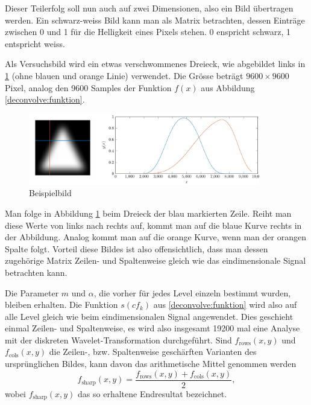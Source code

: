 Dieser Teilerfolg soll nun auch auf zwei Dimensionen, also ein Bild übertragen werden.
Ein schwarz-weiss Bild kann man als Matrix betrachten, dessen Einträge zwischen 0 und 1 für die Helligkeit eines Pixels stehen.
0 enspricht schwarz, 1 entspricht weiss.

Als Versuchsbild wird ein etwas verschwommenes Dreieck, wie abgebildet links in \ref{deconvolve:example} (ohne blauen und orange Linie) verwendet.
Die Grösse beträgt $9600\times9600$ Pixel, analog den 9600 Samples der Funktion $f(x)$ aus Abbildung \ref{deconvolve:funktion}.
\begin{figure}[h]
\centering
\includegraphics[width=0.9\textwidth]{./papers/deconvolve/pictures/dreieck.pdf}
\caption{Beispielbild\label{deconvolve:example}}
\end{figure}

Man folge in Abbildung \ref{deconvolve:example} beim Dreieck der blau markierten \glqq Zeile\grqq{}.
Reiht man diese Werte von links nach rechts auf, kommt man auf die blaue Kurve rechts in der Abbildung.
Analog kommt man auf die orange Kurve, wenn man der orangen \glqq Spalte\grqq{} folgt.
Vorteil diese Bildes ist also offensichtlich, dass man dessen zugehörige Matrix Zeilen- und Spaltenweise gleich wie das eindimensionale Signal betrachten kann.

Die Parameter $m$ und $\alpha$, die vorher für jedes Level einzeln bestimmt wurden, bleiben erhalten.
Die Funktion $s(cf_k)$ aus \eqref{deconvolve:funktion} wird also auf alle Level gleich wie beim eindimensionalen Signal angewendet.
Dies geschieht einmal Zeilen- und Spaltenweise, es wird also insgesamt 19200 mal eine Analyse mit der diskreten Wavelet-Transformation durchgeführt.
Sind $f_\text{rows}(x,y)$ und $f_\text{cols}(x,y)$ die Zeilen-, bzw. Spaltenweise \glqq geschärften\grqq{} Varianten des ursprünglichen Bildes, kann davon das arithmetische Mittel genommen werden
$$f_\text{sharp}(x,y)=\frac{f_\text{rows}(x,y)+f_\text{cols}(x,y)}{2},$$
wobei $f_\text{sharp}(x,y)$ das so erhaltene Endresultat bezeichnet.

